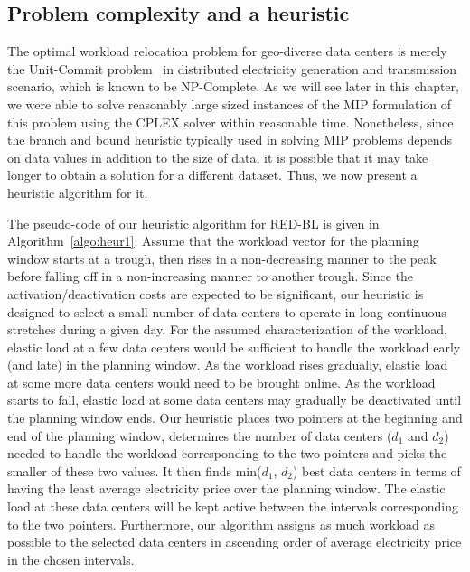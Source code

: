 \subsection{Problem complexity and a heuristic}
\label{subsec:complexityheur} The optimal workload relocation problem for geo-diverse data centers is merely the Unit-Commit problem~\cite{unitcommit-trans} in distributed
electricity generation and transmission scenario, which is known to be NP-Complete. As we will see later in this chapter, we were able to solve reasonably large sized instances of the MIP formulation of this problem using the CPLEX solver within reasonable time. Nonetheless, since the branch and bound heuristic typically used in solving MIP problems depends on data values in addition to the size of data, it is possible that it may take longer to obtain a solution for a different dataset. Thus, we now present a heuristic algorithm for it.

The pseudo-code of our heuristic algorithm for RED-BL is given in Algorithm~\ref{algo:heur1}. Assume that the workload vector for the planning window starts at a trough, then rises in a non-decreasing manner to the peak before falling off in a non-increasing manner to another trough. Since the activation/deactivation costs are expected to be significant, our heuristic is designed to select a small number of data centers to operate in long continuous stretches during a given day. For the assumed characterization of the workload, elastic load at a few data centers would be sufficient to handle the workload early (and late) in the planning window. As the workload rises gradually, elastic load at some more data centers would need to be brought online. As the workload starts to fall, elastic load at some data centers may gradually be deactivated until the planning window ends. Our heuristic places two pointers at the beginning and end of the planning window, determines the number of data centers ($d_1$ and $d_2$) needed to handle the workload corresponding to the two pointers and picks the smaller of these two values. It then finds min($d_1$, $d_2$) best data centers in terms of having the least average electricity price over the planning window. The elastic load at these data centers will be kept active between the intervals corresponding to the two pointers. Furthermore, our algorithm assigns as much workload as possible to the selected data centers in ascending order of average electricity price in the chosen intervals. 

